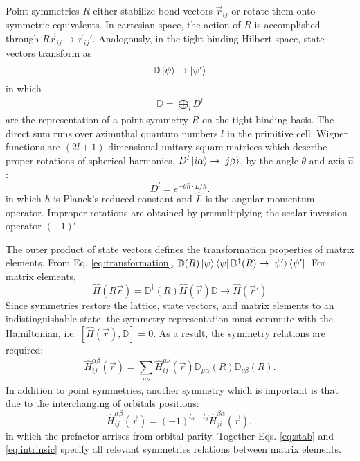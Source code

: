 \documentclass[twocolumn,showpacs,preprintnumbers,superscriptaddress,prb,floatfix,aps,10pt]{revtex4-1}
\newcommand*{\ham}{\hat{H}}
\newcommand*{\wignerD}{\mathbb{D}}%
\newcommand*{\wignerDl}{D^{l}}%
\newcommand*{\bondvec}{\vec{r}_{ij}}
\begin{document}
Point symmetries $R$ either stabilize bond vectors $\bondvec$ or rotate them onto symmetric equivalents. In cartesian space, the action of $R$ is accomplished through $R \vec{r}_{ij} \rightarrow \vec{r}_{ij}'$. Analogously, in the tight-binding Hilbert space, state vectors transform as
%
\begin{equation}
\label{eq:transformation}
\wignerD \ket{\psi} \rightarrow \ket{\psi'}
\end{equation}
%
in which
%
\begin{align}
\wignerD = \bigoplus_l \wignerDl
\end{align}
%
are the representation of a point symmetry $R$ on the tight-binding basis. The direct sum runs over azimuthal quantum numbers $l$ in the primitive cell. Wigner functions are $(2l+1)$-dimensional unitary square matrices which describe proper rotations of spherical harmonics, $\wignerDl \ket{i\alpha} \rightarrow \ket{j\beta}$, by the angle $\theta$ and axis $\hat{n}$:
\begin{equation}
\wignerDl = e^{- \theta \hat{n} \cdot \hat{L} /\hbar}.
\end{equation}
%
in which $\hbar$ is Planck's reduced constant and $\hat{L}$ is the angular momentum operator. Improper rotations are obtained by premultiplying the scalar inversion operator $(-1)^l$. \cite{sharma_general_1979,el-batanouny_symmetry_2008} %

The outer product of state vectors defines the transformation properties of matrix elements. From Eq. \ref{eq:transformation}, $ \mathbb{D}(R)\ket{\psi}\bra{\psi}\mathbb{D}^\dag(R) \rightarrow \ket{\psi'}\bra{\psi'}$. For matrix elements, \cite{el-batanouny_symmetry_2008}
\begin{equation}
\label{eq:transformation_matrix}
\ham( R\vec{r}) = \mathbb{D}^\dag(R) \ham(\vec{r}) \wignerD \rightarrow \ham(\vec{r}')
\end{equation}
%
Since symmetries restore the lattice, state vectors, and matrix elements to an indistinguishable state, the symmetry representation must commute with the Hamiltonian, i.e. $[\ham(\vec{r}),\wignerD] = 0$. As a result, the symmetry relations are required:
\begin{equation}
\label{eq:stab}
\ham^{\alpha\beta}_{ij}(\vec{r}) = \sum_{\mu\nu} \ham^{\mu\nu}_{ij}(\vec{r}) \mathbb{D}_{\mu\alpha}(R) \mathbb{D}_{\nu\beta}(R).
\end{equation}
%
In addition to point symmetries, another symmetry which is important is that due to the interchanging of orbitals positions:
%
\begin{equation}
\label{eq:intrinsic}
\ham^{\alpha\beta}_{ij}(\vec{r}) = (-1)^{l_\alpha+l_\beta} \ham^{\beta\alpha}_{ji}(\vec{r}),
\end{equation}
%
in which the prefactor arrises from orbital parity. Together Eqs. \ref{eq:stab} and \ref{eq:intrinsic} specify all relevant symmetries relations between matrix elements. 
\end{document}
